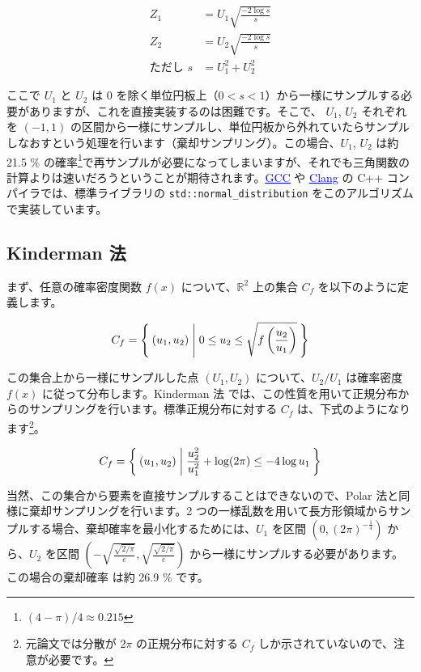 \documentclass[twocolumn, dvipdfmx]{jsarticle}
\begin{document}
\begin{align*}
    Z_1 &= U_1 \sqrt{\frac{-2 \log s}{s}} \\
    Z_2 &= U_2 \sqrt{\frac{-2 \log s}{s}} \\
    \textrm{ただし } s &= U_1 ^2 + U_2 ^2
\end{align*}

ここで $U_1$ と $U_2$ は $0$ を除く単位円板上（$0 < s < 1$）から一様にサンプルする必要がありますが、これを直接実装するのは困難です。そこで、 $U_1$, $U_2$ それぞれを $(-1, 1)$ の区間から一様にサンプルし、単位円板から外れていたらサンプルしなおすという処理を行います（棄却サンプリング）。この場合、$U_1$, $U_2$ は約 21.5 \% の確率\footnote{$(4 - \pi) / 4 \approx 0.215$}で再サンプルが必要になってしまいますが、それでも三角関数の計算よりは速いだろうということが期待されます。\href{https://github.com/gcc-mirror/gcc/blob/60d9f254876a00260992b2f37639ef4d82d9db8f/libstdc++-v3/include/bits/random.tcc#L1818-L1830}{\textcolor{blue}{\underline{GCC}}} や \href{https://github.com/llvm/llvm-project/blob/31dfaff3b395a19f23bb1010bfcec67452efe02d/libcxx/include/random#L4370-L4383}{\textcolor{blue}{\underline{Clang}}} の C++ コンパイラでは、標準ライブラリの \texttt{std::normal\_distribution} をこのアルゴリズムで実装しています。

\subsection*{Kinderman 法}

まず、任意の確率密度関数 $f(x)$ について、$\mathbb{R}^2$ 上の集合 $C_f$ を以下のように定義します。

\begin{align*}
    C_f = \Set{ (u_1, u_2) | 0 \leq u_2 \leq \sqrt{f\left(\frac{u_2}{u_1}\right)} }
\end{align*}

この集合上から一様にサンプルした点 $(U_1, U_2)$ について、${U_2} / {U_1}$ は確率密度 $f(x)$ に従って分布します。Kinderman 法 \cite{kinderman1977computer} では、この性質を用いて正規分布からのサンプリングを行います。標準正規分布に対する $C_f$ は、下式のようになります\footnote{元論文では分散が $2\pi$ の正規分布に対する $C_f$ しか示されていないので、注意が必要です。}。

\begin{align*}
    C_f = \Set{ (u_1, u_2) | \frac{u_2^2}{u_1^2} + \log (2 \pi) \leq -4 \log u_1 }
\end{align*}

当然、この集合から要素を直接サンプルすることはできないので、Polar 法と同様に棄却サンプリングを行います。2 つの一様乱数を用いて長方形領域からサンプルする場合、棄却確率を最小化するためには、$U_1$ を区間 $\left(0, (2 \pi)^{-\frac{1}{4}}\right)$ から、$U_2$ を区間 $\left(-\sqrt{\frac{\sqrt{2 / \pi}}{e}}, \sqrt{\frac{\sqrt{2 / \pi}}{e}}\right)$ から一様にサンプルする必要があります。この場合の棄却確率 は約 26.9 \% です。
\end{document}
